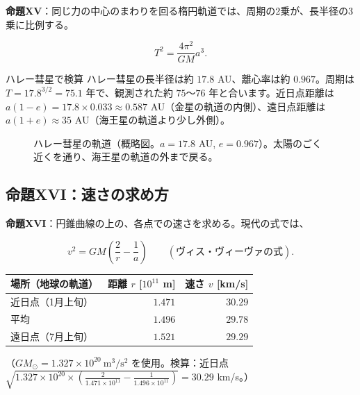 \documentclass[a4paper,11pt,openany]{ltjsbook}
\begin{document}
\textbf{命題XV}：同じ力の中心のまわりを回る楕円軌道では、周期の2乗が、長半径の3乗に比例する。

\[
T^2=\frac{4\pi^2}{GM}a^3.
\]

\begin{examplebox}{ハレー彗星で検算}
ハレー彗星の長半径は約 $17.8$ AU、離心率は約 $0.967$。周期は $T=17.8^{3/2}=75.1$ 年で、観測された約 $75$〜$76$ 年と合います。近日点距離は $a(1-e)=17.8\times0.033\approx0.587$ AU（金星の軌道の内側）、遠日点距離は $a(1+e)\approx35$ AU（海王星の軌道より少し外側）。
\end{examplebox}

\begin{figure}[htbp]
\centering
{}
\caption{ハレー彗星の軌道（概略図。$a=17.8$ AU, $e=0.967$）。太陽のごく近くを通り、海王星の軌道の外まで戻る。}
\end{figure}

\subsection{命題XVI：速さの求め方}

\textbf{命題XVI}：円錐曲線の上の、各点での速さを求める。現代の式では、

\[
v^2=GM\left(\frac2r-\frac1a\right)\qquad(\text{ヴィス・ヴィーヴァの式}).
\]

\begin{center}
\begin{tabular}{lrr}
\toprule
場所（地球の軌道） & 距離 $r$ [$10^{11}$ m] & 速さ $v$ [km/s]\\
\midrule
近日点（1月上旬） & $1.471$ & $30.29$\\
平均 & $1.496$ & $29.78$\\
遠日点（7月上旬） & $1.521$ & $29.29$\\
\bottomrule
\end{tabular}
\end{center}

（$GM_\odot=1.327\times10^{20}\ \mathrm{m^3/s^2}$ を使用。検算：近日点 $\sqrt{1.327\times10^{20}\times(\frac{2}{1.471\times10^{11}}-\frac1{1.496\times10^{11}})}=30.29$ km/s。）
\end{document}
